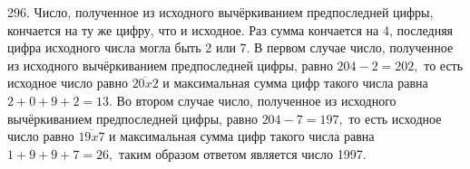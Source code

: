 296. Число, полученное из исходного вычёркиванием предпоследней цифры, кончается на ту же цифру, что и исходное. Раз сумма кончается на 4, последняя цифра исходного числа могла быть 2 или 7. В первом случае число, полученное из исходного вычёркиванием предпоследней цифры, равно $204-2=202,$ то есть исходное число равно $\overline{20x2}$ и максимальная сумма цифр такого числа равна $2+0+9+2=13.$ Во втором случае число, полученное из исходного вычёркиванием предпоследней цифры, равно $204-7=197,$ то есть исходное число равно $\overline{19x7}$ и максимальная сумма цифр такого числа равна $1+9+9+7=26,$ таким образом ответом является число 1997.\\

